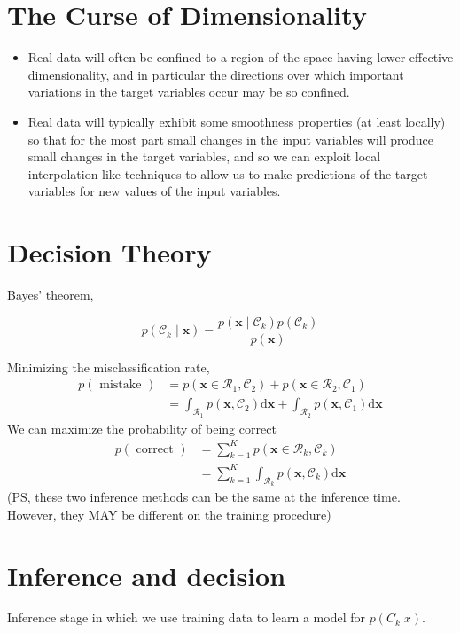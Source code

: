 \documentclass[11pt,en,cite=authoryear]{elegantpaper}
\begin{document}
\section{The Curse of Dimensionality}

\begin{itemize}
    \item Real data will often be conﬁned to a region of the space having lower effective dimensionality, and in particular the directions over which important variations in the target variables occur may be so conﬁned. 
    \item Real data will typically exhibit some smoothness properties (at least locally) so that for the most part small changes in the input variables will produce small changes in the target variables, and so we can exploit local interpolation-like techniques to allow us to make predictions of the target variables for new values of the input variables.
\end{itemize}


\section{Decision Theory}
Bayes’ theorem,

$$
p\left(\mathcal{C}_{k} \mid \mathbf{x}\right)=\frac{p\left(\mathbf{x} \mid \mathcal{C}_{k}\right) p\left(\mathcal{C}_{k}\right)}{p(\mathbf{x})}
$$

Minimizing the misclassiﬁcation rate,
$$
\begin{aligned}
p(\text { mistake }) &=p\left(\mathbf{x} \in \mathcal{R}_{1}, \mathcal{C}_{2}\right)+p\left(\mathbf{x} \in \mathcal{R}_{2}, \mathcal{C}_{1}\right) \\
&=\int_{\mathcal{R}_{1}} p\left(\mathbf{x}, \mathcal{C}_{2}\right) \mathrm{d} \mathbf{x}+\int_{\mathcal{R}_{2}} p\left(\mathbf{x}, \mathcal{C}_{1}\right) \mathrm{d} \mathbf{x}
\end{aligned}
$$
We can maximize the probability of being correct
$$
\begin{aligned}
p(\text { correct }) &=\sum_{k=1}^{K} p\left(\mathbf{x} \in \mathcal{R}_{k}, \mathcal{C}_{k}\right) \\
&=\sum_{k=1}^{K} \int_{\mathcal{R}_{k}} p\left(\mathbf{x}, \mathcal{C}_{k}\right) \mathrm{d} \mathbf{x}
\end{aligned}
$$
(PS, these two inference methods can be the same at the inference time.  However, they MAY be different on the training procedure)

\section{Inference and decision}
Inference stage in which we use training data to learn a model for $p(C_k| x)$. 
\end{document}
